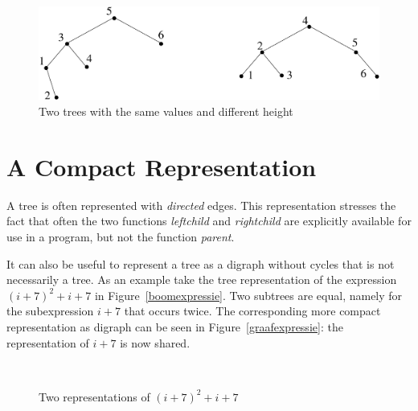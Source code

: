 \begin{figure}[ht]
\begin{center}
\includegraphics[width=0.6\linewidth,keepaspectratio]{balanced1}
\end{center}
\caption{Two trees with the same values and different height \label{balanced1}}
\end{figure}


\section{A Compact Representation}

A tree is often represented with {\em directed} edges. This
representation stresses the fact that often the two functions {\em
leftchild} and {\em rightchild} are explicitly available for use in a
program, but not the function {\em parent}.

It can also be useful to represent a tree as a digraph without cycles
that is not necessarily a tree. As an example take the tree
representation of the expression $(i+7)^{2} + i + 7$ in
Figure~\ref{boomexpressie}. Two subtrees are equal, namely for the
subexpression $i+7$ that occurs twice. The corresponding more compact
representation as digraph can be seen in Figure~\ref{graafexpressie}:
the representation of $i+7$ is now shared.

\begin{figure}[ht]
\mbox{
\hspace{0.5cm}
\hspace{1cm}
}
\caption{Two representations of $(i+7)^{2} + i + 7$}
\end{figure}

